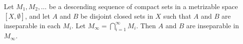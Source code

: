 Let $M_1, M_2, \ldots$ be a descending sequence of compact sets in a metrizable space $[X, \emptyset]$, and let $A$ and $B$ be disjoint closed sets in $X$ such that $A$ and $B$ are inseparable in each $M_i$. Let $M_{\infty} = \bigcap_{i=1}^{\infty} M_i$. Then $A$ and $B$ are inseparable in $M_{\infty}$.
